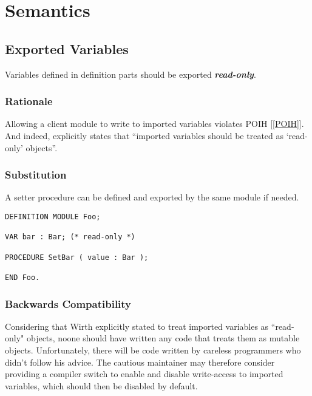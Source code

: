 \documentclass[10pt,a4paper]{article}
\renewcommand{\emph}[1]{\textbf{\textit{#1}}}
\begin{document}
\section{Semantics}

\subsection{Exported Variables}

Variables defined in definition parts should be exported \emph{read-only}. 

\subsubsection{Rationale}

Allowing a client module to write to imported variables violates POIH
[\ref{POIH}]. And indeed, \cite[p.88]{Wirth88} explicitly states that
``imported variables should be treated as `read-only' objects''.

\subsubsection{Substitution}

A setter procedure can be defined and exported by the same module if needed.

\lstset{style=modula2}
\begin{lstlisting}
DEFINITION MODULE Foo;

VAR bar : Bar; (* read-only *)

PROCEDURE SetBar ( value : Bar );

END Foo.
\end{lstlisting}

\subsubsection{Backwards Compatibility}

Considering that Wirth explicitly stated to treat imported variables as
``read-only" objects, noone should have written any code that treats them
as mutable objects. Unfortunately, there will be code written by careless
programmers who didn't follow his advice. The cautious maintainer may therefore
consider providing a compiler switch to enable and disable write-access to
imported variables, which should then be disabled by default.
\end{document}
